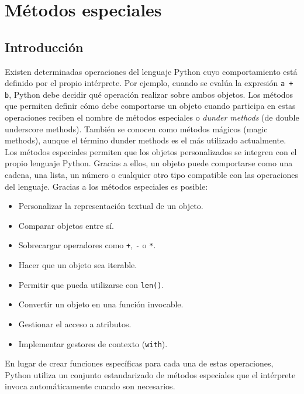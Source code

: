 \documentclass[11pt,a5paper,twoside]{book}
\begin{document}
\newpage

\section{Métodos especiales}
\subsection{Introducción}
Existen determinadas operaciones del lenguaje Python cuyo comportamiento está definido por el propio intérprete. Por ejemplo, cuando se evalúa la expresión {\scriptsize \texttt{a + b}}, Python debe decidir qué operación realizar sobre ambos objetos. Los métodos que permiten definir cómo debe comportarse un objeto cuando participa en estas operaciones reciben el nombre de métodos especiales o \textit{dunder methods} (de double underscore methods). También se conocen como métodos mágicos (magic methods), aunque el término dunder methods es el más utilizado actualmente.
Los métodos especiales permiten que los objetos personalizados se integren con el propio lenguaje Python. Gracias a ellos, un objeto puede comportarse como una cadena, una lista, un número o cualquier otro tipo compatible con las operaciones del lenguaje.
Gracias a los métodos especiales es posible:

\begin{itemize}
\item  Personalizar la representación textual de un objeto.
\item  Comparar objetos entre sí.
\item  Sobrecargar operadores como {\scriptsize \texttt{+}}, {\scriptsize \texttt{-}} o {\scriptsize \texttt{*}}.
\item  Hacer que un objeto sea iterable.
\item  Permitir que pueda utilizarse con {\scriptsize \texttt{len()}}.
\item  Convertir un objeto en una función invocable.
\item  Gestionar el acceso a atributos.
\item  Implementar gestores de contexto ({\scriptsize \texttt{with}}).
\end{itemize}
En lugar de crear funciones específicas para cada una de estas operaciones, Python utiliza un conjunto estandarizado de métodos especiales que el intérprete invoca automáticamente cuando son necesarios.
\end{document}
